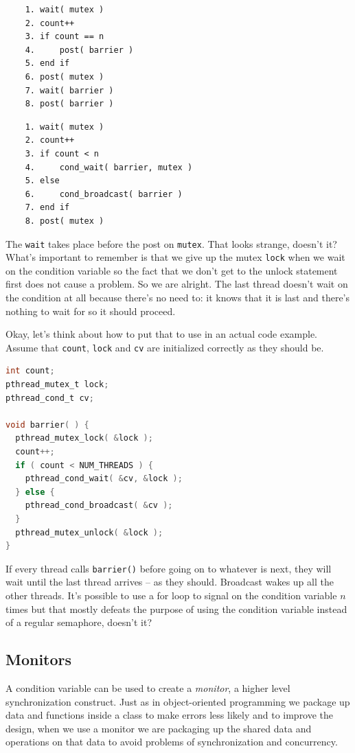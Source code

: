 \documentclass[a4paper]{report}
\begin{document}
\begin{multicols}{2}
	\begin{verbatim}
	1. wait( mutex )
	2. count++
	3. if count == n
	4.     post( barrier )
	5. end if
	6. post( mutex )
	7. wait( barrier )
	8. post( barrier )
  \end{verbatim}
	\columnbreak
	\begin{verbatim}
	1. wait( mutex )
	2. count++
	3. if count < n
	4.     cond_wait( barrier, mutex )
	5. else 
	6.     cond_broadcast( barrier )
	7. end if
	8. post( mutex )
  \end{verbatim}
\end{multicols}

The \texttt{wait} takes place before the post on \texttt{mutex}. That looks strange, doesn't it? What's important to remember is that we give up the mutex \texttt{lock} when we wait on the condition variable so the fact that we don't get to the unlock statement first does not cause a problem. So we are alright. The last thread doesn't wait on the condition at all because there's no need to: it knows that it is last and there's nothing to wait for so it should proceed.

Okay, let's think about how to put that to use in an actual code example. Assume that \texttt{count}, \texttt{lock} and \texttt{cv} are initialized correctly as they should be.

\begin{lstlisting}[language=C]
int count;
pthread_mutex_t lock;
pthread_cond_t cv; 

void barrier( ) {
  pthread_mutex_lock( &lock );
  count++;
  if ( count < NUM_THREADS ) {
    pthread_cond_wait( &cv, &lock );
  } else {
    pthread_cond_broadcast( &cv );
  }
  pthread_mutex_unlock( &lock );
}
\end{lstlisting}

If every thread calls \texttt{barrier()} before going on to whatever is next, they will wait until the last thread arrives -- as they should. Broadcast wakes up all the other threads. It's possible to use a for loop to signal on the condition variable $n$ times but that mostly defeats the purpose of using the condition variable instead of a regular semaphore, doesn't it?

\subsection*{Monitors}
A condition variable can be used to create a \textit{monitor}, a higher level synchronization construct. Just as in object-oriented programming we package up data and functions inside a class to make errors less likely and to improve the design, when we use a monitor we are packaging up the shared data and operations on that data to avoid problems of synchronization and concurrency.
\end{document}
